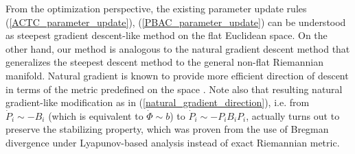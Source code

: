 \documentclass[letterpaper, 10 pt, conference]{ieeeconf}  %
\newtheorem{remark}{Remark}
\begin{document}

From the optimization perspective, the existing parameter update rules (\ref{ACTC_parameter_update}), (\ref{PBAC_parameter_update}) can be understood as steepest gradient descent-like method on the flat Euclidean space. On the other hand, our method is analogous to the natural gradient descent method that generalizes the steepest descent method to the general non-flat Riemannian manifold. Natural gradient is known to provide more efficient direction of descent in terms of the metric predefined on the space \cite{Amari_Naturalgrad}. Note also that resulting natural gradient-like modification as in (\ref{natural_gradient_direction}), i.e. from $\dot{P}_i \sim -B_i$ (which is equivalent to $\dot{\Phi} \sim b$) to $ \dot{P}_i\sim -P_iB_iP_i$, actually turns out to preserve the stabilizing property, which was proven from the use of Bregman divergence under Lyapunov-based analysis instead of exact Riemannian metric.
\end{document}
